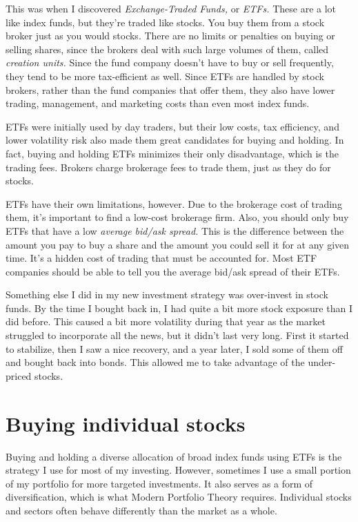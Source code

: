 This was when I discovered \emph{Exchange-Traded Funds,} or \emph{ETFs.} These are a lot like index funds, but they're traded like stocks. You buy them from a stock broker just as you would stocks. There are no limits or penalties on buying or selling shares, since the brokers deal with such large volumes of them, called \emph{creation units.} Since the fund company doesn't have to buy or sell frequently, they tend to be more tax-efficient as well. Since ETFs are handled by stock brokers, rather than the fund companies that offer them, they also have lower trading, management, and marketing costs than even most index funds.

ETFs were initially used by day traders, but their low costs, tax efficiency, and lower volatility risk also made them great candidates for buying and holding. In fact, buying and holding ETFs minimizes their only disadvantage, which is the trading fees. Brokers charge brokerage fees to trade them, just as they do for stocks.

ETFs have their own limitations, however. Due to the brokerage cost of trading them, it's important to find a low-cost brokerage firm. Also, you should only buy ETFs that have a low \emph{average bid/ask spread.} This is the difference between the amount you pay to buy a share and the amount you could sell it for at any given time. It's a hidden cost of trading that must be accounted for. Most ETF companies should be able to tell you the average bid/ask spread of their ETFs.

Something else I did in my new investment strategy was over-invest in stock funds. By the time I bought back in, I had quite a bit more stock exposure than I did before. This caused a bit more volatility during that year as the market struggled to incorporate all the news, but it didn't last very long. First it started to stabilize, then I saw a nice recovery, and a year later, I sold some of them off and bought back into bonds. This allowed me to take advantage of the under-priced stocks.

\section{Buying individual stocks}
Buying and holding a diverse allocation of broad index funds using ETFs is the strategy I use for most of my investing. However, sometimes I use a small portion of my portfolio for more targeted investments. It also serves as a form of diversification, which is what Modern Portfolio Theory requires. Individual stocks and sectors often behave differently than the market as a whole.

